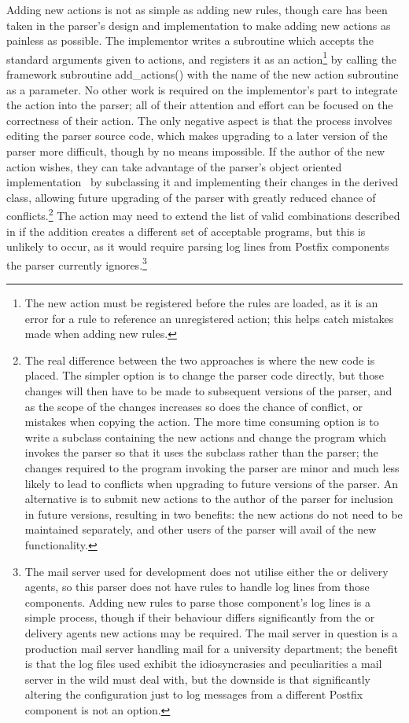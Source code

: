 \label{adding new actions}

Adding new actions is not as simple as adding new rules, though care has
been taken in the parser's design and implementation to make adding new
actions as painless as possible.  The implementor writes a subroutine which
accepts the standard arguments given to actions, and registers it as an
action\footnote{The new action must be registered before the rules are
loaded, as it is an error for a rule to reference an unregistered action;
this helps catch mistakes made when adding new rules.} by calling the
framework subroutine add\_actions() with the name of the new action
subroutine as a parameter.  No other work is required on the implementor's
part to integrate the action into the parser; all of their attention and
effort can be focused on the correctness of their action.  The only
negative aspect is that the process involves editing the parser source
code, which makes upgrading to a later version of the parser more
difficult, though by no means impossible.  If the author of the new action
wishes, they can take advantage of the parser's object oriented
implementation~\cite{Wikipedia-object-orientation} by subclassing it and
implementing their changes in the derived class, allowing future upgrading
of the parser with greatly reduced chance of conflicts.\footnote{The real
difference between the two approaches is where the new code is placed.  The
simpler option is to change the parser code directly, but those changes
will then have to be made to subsequent versions of the parser, and as the
scope of the changes increases so does the chance of conflict, or mistakes
when copying the action.  The more time consuming option is to write a
subclass containing the new actions and change the program which invokes
the parser so that it uses the subclass rather than the parser; the changes
required to the program invoking the parser are minor and much less likely
to lead to conflicts when upgrading to future versions of the parser.  An
alternative is to submit new actions to the author of the parser for
inclusion in future versions, resulting in two benefits: the new actions do
not need to be maintained separately, and other users of the parser will
avail of the new functionality.} The action may need to extend the list of
valid combinations described in  if the
addition creates a different set of acceptable programs, but this is
unlikely to occur, as it would require parsing log lines from Postfix
components the parser currently ignores.\footnote{The mail server used for
development does not utilise either the  or 
delivery agents, so this parser does not have rules to handle log lines
from those components.  Adding new rules to parse those component's log
lines is a simple process, though if their behaviour differs significantly
from the  or  delivery agents new actions may be
required.  The mail server in question is a production mail server handling
mail for a university department; the benefit is that the log files used
exhibit the idiosyncrasies and peculiarities a mail server in the wild must
deal with, but the downside is that significantly altering the
configuration just to log messages from a different Postfix component is
not an option.}


